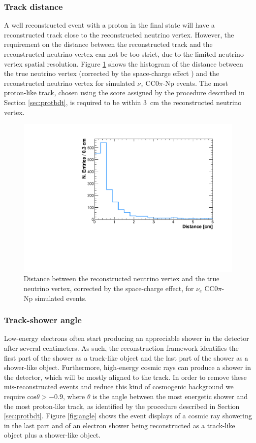\subsubsection{Track distance}
A well reconstructed event with a proton in the final state will have a reconstructed track close to the reconstructed neutrino vertex. However, the requirement on the distance between the reconstructed track and the reconstructed neutrino vertex can not be too strict, due to the limited neutrino vertex spatial resolution. Figure \ref{fig:dist} shows the histogram of the distance between the true neutrino vertex (corrected by the space-charge effect \cite{sce}) and the reconstructed neutrino vertex for simulated $\nu_{e}$ CC0$\pi$-Np events. The most proton-like track, chosen using the score assigned by the procedure described in Section \ref{sec:protbdt}, is required to be within 3~cm the reconstructed neutrino vertex.

\begin{figure}[htbp]
\centering
  \includegraphics[width=0.7\linewidth]{figures/dist.pdf}
  \caption{Distance between the reconstructed neutrino vertex and the true neutrino vertex, corrected by the space-charge effect, for $\nu_{e}$ CC0$\pi$-Np simulated events.}\label{fig:dist}
\end{figure}



\subsubsection{Track-shower angle}
Low-energy electrons often start producing an appreciable shower in the detector after several centimeters. As such, the reconstruction framework identifies the first part of the shower as a track-like object and the last part of the shower as a shower-like object. 
Furthermore, high-energy cosmic rays can produce a shower in the detector, which will be mostly aligned to the track. In order to remove these mis-reconstructed events and reduce this kind of cosmogenic background we require $\mathrm{cos}\theta > -0.9$, where $\theta$ is the angle between the most energetic shower and the most proton-like track, as identified by the procedure described in Section \ref{sec:protbdt}.
Figure \ref{fig:angle} shows the event displays of a cosmic ray showering in the last part and of an electron shower being reconstructed as a track-like object plus a shower-like object.

